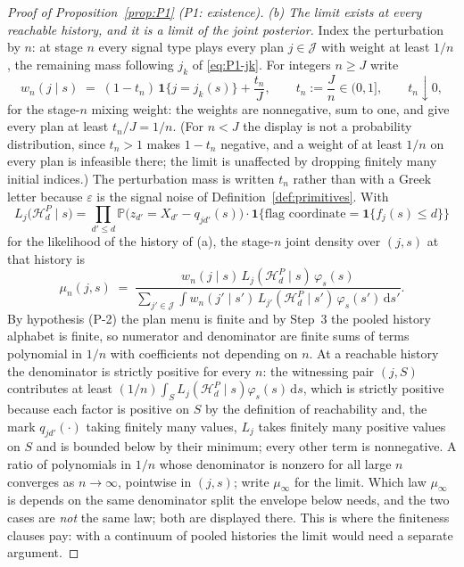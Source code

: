 \documentclass[11pt]{article}
\newcommand{\Prb}{\mathbb{P}}
\newcommand{\ind}{\mathbf{1}}
\begin{document}
\begin{proof}[Proof of Proposition~\ref{prop:P1} (P1: existence)]
\emph{(b) The limit exists at every reachable history, and it is a limit of the joint posterior.}
Index the perturbation by $n$: at stage $n$ every signal type plays every plan $j \in \mathcal J$
with weight at least $1/n$, the remaining mass following $j_k$ of \eqref{eq:P1-jk}. For integers
$n \ge J$ write
\begin{equation}
\label{eq:P1-wn}
w_n(j \mid s) \;=\; (1-t_n)\,\ind\{j = j_k(s)\} + \frac{t_n}{J},
\qquad
t_n := \frac{J}{n} \in (0,1],
\qquad
t_n \downarrow 0,
\end{equation}
for the stage-$n$ mixing weight: the weights are nonnegative, sum to one, and give every plan at
least $t_n/J = 1/n$. (For $n < J$ the display is not a probability distribution, since $t_n > 1$
makes $1-t_n$ negative, and a weight of at least $1/n$ on every plan is infeasible there; the limit
is unaffected by dropping finitely many initial indices.) The perturbation mass is written $t_n$
rather than with a Greek letter because $\varepsilon$ is the signal noise of
Definition~\ref{def:primitives}. With
\[
L_j\bigl(\mathcal H_d^P \mid s\bigr)
= \prod_{d' \le d} \Prb\bigl(z_{d'} = X_{d'}-q_{jd'}(s)\bigr)
\cdot \ind\bigl\{\text{flag coordinate} = \ind\{f_j(s) \le d\}\bigr\}
\]
for the likelihood of the history of (a), the stage-$n$ joint density over $(j,s)$ at that history is
\begin{equation}
\label{eq:P1-mun}
\mu_n(j,s) \;=\; \frac{w_n(j \mid s)\,L_j(\mathcal H_d^P \mid s)\,\varphi_s(s)}
{\sum_{j' \in \mathcal J} \int w_n(j' \mid s')\,L_{j'}(\mathcal H_d^P \mid s')\,\varphi_s(s')\,
\mathrm{d}s'}.
\end{equation}
By hypothesis (P-2) the plan menu is finite and by Step~3 the pooled history alphabet is finite, so
numerator and denominator are finite sums of terms polynomial in $1/n$ with coefficients not
depending on $n$. At a reachable history the denominator is strictly positive for every $n$: the
witnessing pair $(j,S)$ contributes at least $(1/n)\int_S L_j(\mathcal H_d^P \mid s)\varphi_s(s)\,
\mathrm{d}s$, which is strictly positive because each factor is positive on $S$ by the definition of
reachability and, the mark $q_{jd'}(\cdot)$ taking finitely many values, $L_j$ takes finitely many
positive values on $S$ and is bounded below by their minimum; every other term is nonnegative. A
ratio of polynomials in $1/n$ whose denominator is nonzero for all large $n$ converges as
$n \to \infty$, pointwise in $(j,s)$; write $\mu_\infty$ for the limit. Which law $\mu_\infty$ is
depends on the same denominator split the envelope below needs, and the two cases are \emph{not} the
same law; both are displayed there. This is where the finiteness clauses pay: with a continuum of
pooled histories the limit would need a separate argument.


\end{proof}
\end{document}
